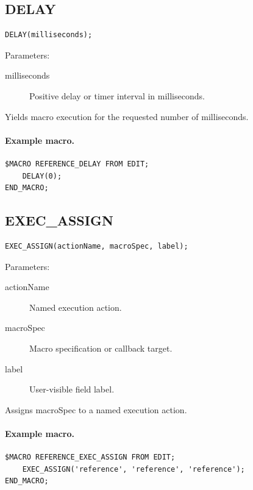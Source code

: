 \documentclass[a4paper,10pt,twoside,openany]{book}
\newenvironment{mrmacextension}{\begin{changebar}}{\end{changebar}}
\begin{document}
\begin{mrmacextension}
\label{prim:procedure-delay}
\subsection*{DELAY}
\begin{verbatim}
DELAY(milliseconds);
\end{verbatim}
Parameters:
\begin{description}
\item[milliseconds] Positive delay or timer interval in milliseconds.
\end{description}

Yields macro execution for the requested number of milliseconds.

\paragraph{Example macro.}
\begin{verbatim}
$MACRO REFERENCE_DELAY FROM EDIT;
    DELAY(0);
END_MACRO;
\end{verbatim}
\end{mrmacextension}

\begin{mrmacextension}
\label{prim:procedure-exec-assign}
\subsection*{EXEC\_ASSIGN}
\begin{verbatim}
EXEC_ASSIGN(actionName, macroSpec, label);
\end{verbatim}
Parameters:
\begin{description}
\item[actionName] Named execution action.
\item[macroSpec] Macro specification or callback target.
\item[label] User-visible field label.
\end{description}

Assigns macroSpec to a named execution action.

\paragraph{Example macro.}
\begin{verbatim}
$MACRO REFERENCE_EXEC_ASSIGN FROM EDIT;
    EXEC_ASSIGN('reference', 'reference', 'reference');
END_MACRO;
\end{verbatim}
\end{mrmacextension}
\end{document}
